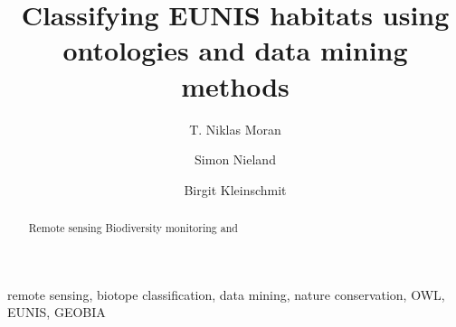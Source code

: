 \documentclass[authoryear, review,12pt,number]{elsarticle}
\begin{document}



\begin{frontmatter}
\linenumbers
\title{Classifying EUNIS habitats using ontologies and data mining methods}

\author[TUB]{T. Niklas Moran}

\author[TUB]{Simon Nieland}
\author[TUB]{Birgit Kleinschmit}

\address[TUB]{Geoinformation in Environmental Planning Lab, Technische
Universit\"at Berlin, Stra\ss e des 17. Juni 145, 10623 Berlin, Germany}


\begin{abstract}
  Remote sensing Biodiversity monitoring and 
\end{abstract}

\begin{keyword}
remote sensing, biotope classification, data mining, nature conservation, OWL, EUNIS, GEOBIA
\end{keyword}
\end{frontmatter}
\linenumbers
\end{document}
